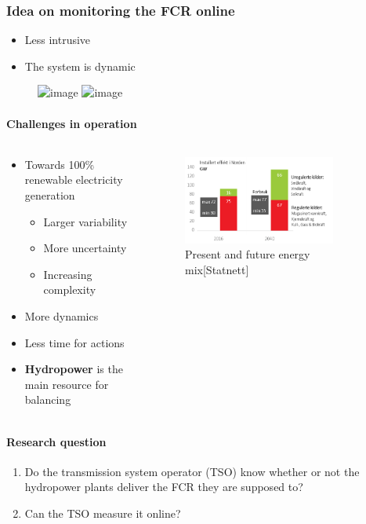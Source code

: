 \begin{frame}
	\frametitle{Idea on monitoring the FCR online}
	\begin{itemize}[<+->]
		\item Less intrusive
		\item The system is dynamic
	\end{itemize}
	\begin{figure}
		\includegraphics<2>[width=0.5\textwidth]{./pictures/static}
		\includegraphics<1>{./pictures/sld.tikz}
	\end{figure}
\end{frame}
\begin{frame}{\secname}
	\framesubtitle{Challenges in operation}
	\begin{columns}
		\begin{column}{0.5\textwidth}
		\begin{itemize}
			\item<1-> Towards 100\% renewable electricity generation
			\begin{itemize}
				\item Larger variability
				\item More uncertainty
				\item Increasing complexity
			\end{itemize}
			\item<2-> More dynamics
			\item<3-> Less time for actions
			\item<4-> \textbf{Hydropower} is the main resource for balancing
\end{itemize}
\end{column}
	\begin{column}{0.5\textwidth}
	\begin{figure}
	\includegraphics[width=0.8\textwidth]{./pictures/mix}
	\caption{Present and future energy mix[Statnett]}
	\end{figure}
	\end{column}
	\end{columns}
\end{frame}
\begin{frame}
	\framesubtitle{Research question}
	\begin{enumerate}
		\item<1-> Do the transmission system operator (TSO) know whether or not the hydropower plants deliver the FCR they are supposed to?
		\item<2-> Can the TSO measure it online?
	\end{enumerate}
\end{frame}
